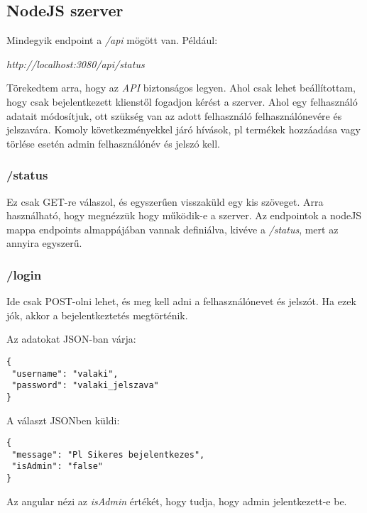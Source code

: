 \documentclass[]{article}
\begin{document}
\subsection{NodeJS szerver}

Mindegyik endpoint a \textit{/api} mögött van. Például:

\bigskip
\begin{center}
	\textit{http://localhost:3080/api/status}
\end{center}

Törekedtem arra, hogy az \textit{API} biztonságos legyen. Ahol csak lehet beállítottam, hogy csak bejelentkezett klienstől fogadjon kérést a szerver. Ahol egy felhasználó adatait módosítjuk, ott szükség van az adott felhasználó felhasználónevére és jelszavára. Komoly következményekkel járó hívások, pl termékek hozzáadása vagy törlése esetén admin felhasználónév és jelszó kell.

\subsubsection{/status}

Ez csak GET-re válaszol, és egyszerűen visszaküld egy kis szöveget. Arra használható, hogy megnézzük hogy működik-e a szerver. Az endpointok a nodeJS mappa endpoints almappájában vannak definiálva, kivéve a \textit{/status}, mert az annyira egyszerű.

\subsubsection{/login}

Ide csak POST-olni lehet, és meg kell adni a felhasználónevet és jelszót. Ha ezek jók, akkor a bejelentkeztetés megtörténik.

\noindent
Az adatokat JSON-ban várja:

\bigskip
\begin{lstlisting}
{
 "username": "valaki",
 "password": "valaki_jelszava"
}
\end{lstlisting}

\noindent
A választ JSONben küldi:

\bigskip
\begin{lstlisting}
{
 "message": "Pl Sikeres bejelentkezes",
 "isAdmin": "false"
}
\end{lstlisting}

\noindent
Az angular nézi az \textit{isAdmin} értékét, hogy tudja, hogy admin jelentkezett-e be.
\end{document}

